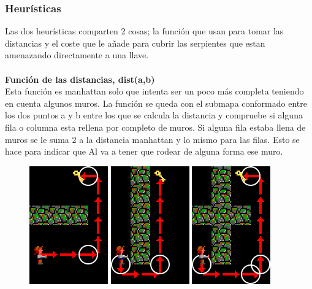 \documentclass[11pt,spanish]{article}
\begin{document}
		\subsubsection{Heurísticas}
		Las dos heurísticas comparten 2 cosas; la función que usan para tomar las distancias y el coste que le añade para cubrir las serpientes que estan amenazando directamente a una llave.\\
			\\
			\textbf{Función de las distancias, dist(a,b)}\\
			Esta función es manhattan solo que intenta ser un poco más completa teniendo en cuenta algunos muros. La función se queda con el submapa conformado entre los dos puntos a y b entre los que se calcula la distancia y compruebe si alguna fila o columna esta rellena por completo de muros. Si alguna fila estaba llena de muros se le suma 2 a la distancia manhattan y lo mismo para las filas. Esto se hace para indicar que Al va a tener que rodear de alguna forma ese muro.
			\begin{figure}[h!]
				\centering
				\includegraphics[width=0.2\linewidth]{Horizontal.png}
				\includegraphics[width=0.2\linewidth]{Vertical.png}
				\includegraphics[width=0.2\linewidth]{HorizontalVertical.png}
			\end{figure}
\end{document}
